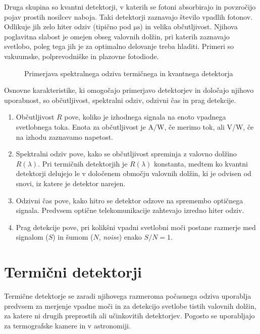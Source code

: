 Druga skupina so kvantni detektorji, v katerih se
fotoni absorbirajo in povzročijo pojav prostih nosilcev naboja. Taki detektorji
zaznavajo število vpadlih fotonov. Odlikuje jih zelo hiter odziv 
(tipično pod $\si{\micro\second}$)
in velika občutljivost. Njihova poglavitna slabost je omejen obseg valovnih dolžin,
pri katerih zaznavajo svetlobo, poleg tega jih je za optimalno delovanje treba 
hladiti. Primeri so vakuumske, polprevodniške in plazovne fotodiode.
\begin{figure}[h]
\centering
\def\svgwidth{65truemm} 

\caption{Primerjava spektralnega odziva termičnega in kvantnega detektorja}
\label{fig:shemaTermKv}
\end{figure}

Osnovne karakteristike, ki omogočajo primerjavo detektorjev in določajo njihovo uporabnost,
so občutljivost, spektralni odziv, odzivni čas in prag detekcije. 

\begin{enumerate}
\item Občutljivost $R$ pove, koliko je izhodnega signala 
na enoto vpadnega svetlobnega toka. Enota za občutljivost je A/W, če merimo tok, ali V/W, 
če na izhodu zaznavamo napetost. 
\item Spektralni odziv pove, kako se občutljivost spreminja z valovno dolžino $R(\lambda)$.
Pri termičnih detektorjih je $R(\lambda)$ konstanta, medtem ko kvantni detektorji 
delujejo le v določenem območju valovnih dolžin, ki je odvisen od snovi, 
iz katere je detektor narejen. 
\item Odzivni čas pove, kako hitro se detektor odzove na spremembo optičnega signala. Predvsem 
optične telekomunikacije zahtevajo izredno hiter odziv.
\item Prag detekcije pove, pri kolikšni vpadni svetlobni moči postane razmerje med signalom ($S$)
in šumom ($N$, {\it noise}) enako $S/N = 1$. 
\end{enumerate}

\section{Termični detektorji}
Termične detektorje se zaradi njihovega razmeroma počasnega odziva uporablja predvsem 
za merjenje vpadne moči in za detekcijo svetlobe tistih valovnih dolžin, za katere 
ni drugih preprostih ali učinkovitih detektorjev. Pogosto se uporabljajo za termografske 
kamere in v astronomiji.

